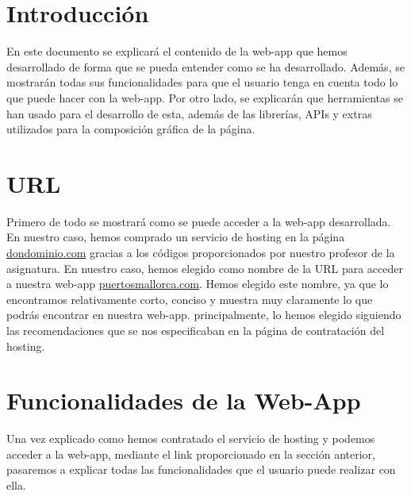 \documentclass{article}
\begin{document}
\section{Introducción}
En este documento se explicará el contenido de la web-app que hemos desarrollado de forma que se pueda entender como se ha desarrollado. Además, se mostrarán todas sus funcionalidades para que el usuario tenga en cuenta todo lo que puede hacer con la web-app. Por otro lado, se explicarán que herramientas se han usado para el desarrollo de esta, además de las librerías, APIs y extras utilizados para la composición gráfica de la página.

\section{URL}
Primero de todo se mostrará como se puede acceder a la web-app desarrollada. En nuestro caso, hemos comprado un servicio de hosting en la página \href{https://www.dondominio.com/es/}{dondominio.com} gracias a los códigos proporcionados por nuestro profesor de la asignatura. En nuestro caso, hemos elegido como nombre de la URL para acceder a nuestra web-app \href{https://www.puertosmallorca.com/}{puertosmallorca.com}. Hemos elegido este nombre, ya que lo encontramos relativamente corto, conciso y muestra muy claramente lo que podrás encontrar en nuestra web-app. principalmente, lo hemos elegido siguiendo las recomendaciones que se nos especificaban en la página de contratación del hosting.

\section{Funcionalidades de la Web-App}
Una vez explicado como hemos contratado el servicio de hosting y podemos acceder a la web-app, mediante el link proporcionado en la sección anterior, pasaremos a explicar todas las funcionalidades que el usuario puede realizar con ella.
\end{document}
